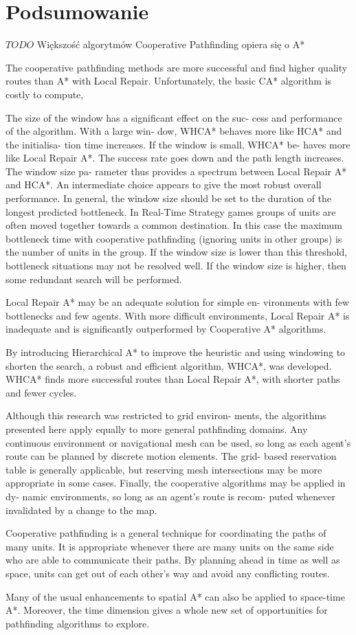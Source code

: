\chapter{Podsumowanie}
\label{ch:podsumowanie}

$TODO$
Większość algorytmów Cooperative Pathfinding opiera się o A*

The cooperative pathfinding methods are more successful
and find higher quality routes than A* with Local Repair.
Unfortunately, the basic CA* algorithm is costly to compute,

The size of the window has a significant effect on the suc-
cess and performance of the algorithm. With a large win-
dow, WHCA* behaves more like HCA* and the initialisa-
tion time increases. If the window is small, WHCA* be-
haves more like Local Repair A*. The success rate goes
down and the path length increases. The window size pa-
rameter thus provides a spectrum between Local Repair A*
and HCA*. An intermediate choice appears to give the most robust overall performance.
In general, the window size should be set to the duration
of the longest predicted bottleneck. In Real-Time Strategy
games groups of units are often moved together towards a
common destination. In this case the maximum bottleneck
time with cooperative pathfinding (ignoring units in other
groups) is the number of units in the group. If the window
size is lower than this threshold, bottleneck situations may
not be resolved well. If the window size is higher, then some
redundant search will be performed.

Local Repair A* may be an adequate solution for simple en-
vironments with few bottlenecks and few agents. With more
difficult environments, Local Repair A* is inadequate and is
significantly outperformed by Cooperative A* algorithms.

By introducing Hierarchical A* to improve the heuristic and
using windowing to shorten the search, a robust and efficient
algorithm, WHCA*, was developed. WHCA* finds more
successful routes than Local Repair A*, with shorter paths
and fewer cycles.

Although this research was restricted to grid environ-
ments, the algorithms presented here apply equally to more
general pathfinding domains. Any continuous environment
or navigational mesh can be used, so long as each agent’s
route can be planned by discrete motion elements. The grid-
based reservation table is generally applicable, but reserving
mesh intersections may be more appropriate in some cases.
Finally, the cooperative algorithms may be applied in dy-
namic environments, so long as an agent’s route is recom-
puted whenever invalidated by a change to the map.


Cooperative pathfinding is a general technique for coordinating the paths of many units.
It is appropriate whenever there are many units on the same side who are able to
communicate their paths. By planning ahead in time as well as space, units can get out of
each other’s way and avoid any conflicting routes.

Many of the usual enhancements to spatial A* can also be applied to space-time A*.
Moreover, the time dimension gives a whole new set of opportunities for pathfinding
algorithms to explore.
